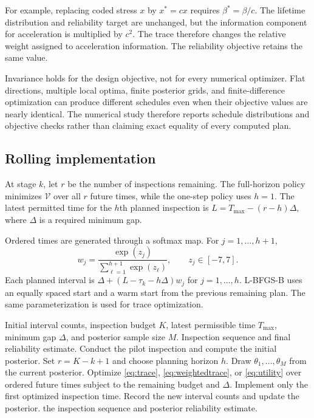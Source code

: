 \documentclass[a4paper,fleqn]{cas-sc}
\begin{document}
For example, replacing coded stress $x$ by $x^*=cx$ requires $\beta^*=\beta/c$. The lifetime distribution and reliability target are unchanged, but the information component for acceleration is multiplied by $c^2$. The trace therefore changes the relative weight assigned to acceleration information. The reliability objective retains the same value.

Invariance holds for the design objective, not for every numerical optimizer. Flat directions, multiple local optima, finite posterior grids, and finite-difference optimization can produce different schedules even when their objective values are nearly identical. The numerical study therefore reports schedule distributions and objective checks rather than claiming exact equality of every computed plan.

\subsection{Rolling implementation}

At stage $k$, let $r$ be the number of inspections remaining. The full-horizon policy minimizes $\mathcal V$ over all $r$ future times, while the one-step policy uses $h=1$. The latest permitted time for the $h$th planned inspection is $L=T_{\max}-(r-h)\Delta$, where $\Delta$ is a required minimum gap.

Ordered times are generated through a softmax map. For $j=1,\ldots,h+1$,
\begin{equation}
w_j=\frac{\exp(z_j)}{\sum_{\ell=1}^{h+1}\exp(z_\ell)},\qquad z_j\in[-7,7].
\end{equation}
Each planned interval is $\Delta+(L-\tau_k-h\Delta)w_j$ for $j=1,\ldots,h$. L-BFGS-B uses an equally spaced start and a warm start from the previous remaining plan. The same parameterization is used for trace optimization.

\begin{algorithm}[t]
\caption{Full-horizon sequential inspection with a chosen criterion}
\label{alg:sequential}
\begin{algorithmic}[1]
\REQUIRE Initial interval counts, inspection budget $K$, latest permissible time $T_{\max}$, minimum gap $\Delta$, and posterior sample size $M$.
\ENSURE Inspection sequence and final reliability estimate.
\STATE Conduct the pilot inspection and compute the initial posterior.
  \STATE Set $r=K-k+1$ and choose planning horizon $h$.
  \STATE Draw $\theta_1,\ldots,\theta_M$ from the current posterior.
  \STATE Optimize \eqref{eq:trace}, \eqref{eq:weightedtrace}, or \eqref{eq:utility} over ordered future times subject to the remaining budget and $\Delta$.
  \STATE Implement only the first optimized inspection time.
  \STATE Record the new interval counts and update the posterior.
\ENDFOR
\RETURN the inspection sequence and posterior reliability estimate.
\end{algorithmic}
\end{algorithm}
\end{document}
